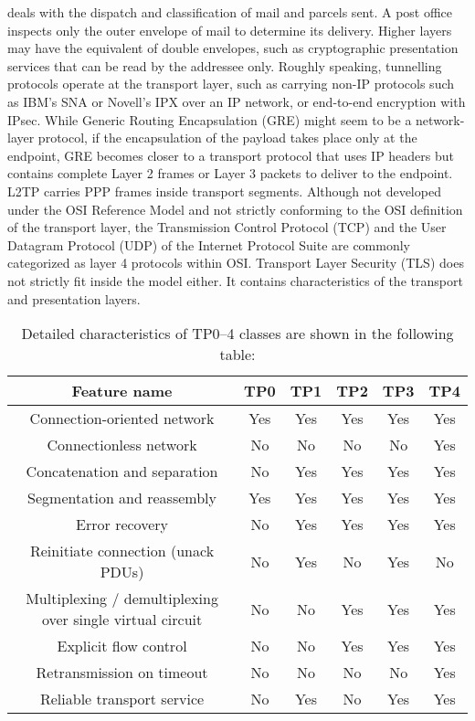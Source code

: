 \documentclass{article}
\begin{document}
\begin{enumerate}[label = \arabic*]
deals with the dispatch and classification of mail and parcels sent. A post office inspects only the outer envelope of mail to determine its delivery. Higher layers may have the equivalent of double envelopes, such as cryptographic presentation services that can be read by the addressee only. Roughly speaking, tunnelling protocols operate at the transport layer, such as carrying non-IP protocols such as IBM's SNA or Novell's IPX over an IP network, or end-to-end encryption with IPsec. While Generic Routing Encapsulation (GRE) might seem to be a network-layer protocol, if the encapsulation of the payload takes place only at the endpoint, GRE becomes closer to a transport protocol that uses IP headers but contains complete Layer 2 frames or Layer 3 packets to deliver to the endpoint. L2TP carries PPP frames inside transport segments. Although not developed under the OSI Reference Model and not strictly conforming to the OSI definition of the transport layer, the Transmission Control Protocol (TCP) and the User Datagram Protocol (UDP) of the Internet Protocol Suite are commonly categorized as layer 4 protocols within OSI. Transport Layer Security (TLS) does not strictly fit inside the model either. It contains characteristics of the transport and presentation layers.

	\subitem
	\begin{table}[h]
	\centering
	\caption{Detailed characteristics of TP0–4 classes are shown in the following table:}
	\begin{tabular}{|c|c|c|c|c|c|}
	\hline
	Feature name & TP0 & TP1 & TP2 & TP3 & TP4 \\ \hline
	Connection-oriented network & Yes & Yes & Yes & Yes & Yes \\ \hline
	Connectionless network  & No & No & No & No & Yes \\ \hline
	Concatenation and separation  & No & Yes & Yes & Yes & Yes \\ \hline
	Segmentation and reassembly  & Yes & Yes & Yes & Yes & Yes \\ \hline
	Error recovery  & No & Yes & Yes & Yes & Yes \\ \hline
	Reinitiate connection (unack PDUs) & No & Yes & No & Yes & No \\ \hline
	Multiplexing / demultiplexing over single virtual circuit & No & No & Yes & Yes & Yes \\ \hline
	Explicit flow control  & No & No & Yes & Yes & Yes \\ \hline
	Retransmission on timeout  & No & No & No & No & Yes \\ \hline
	Reliable transport service  & No & Yes & No & Yes & Yes \\ \hline
	\end{tabular}
	\end{table}
	\FloatBarrier



\end{enumerate}
\end{document}
